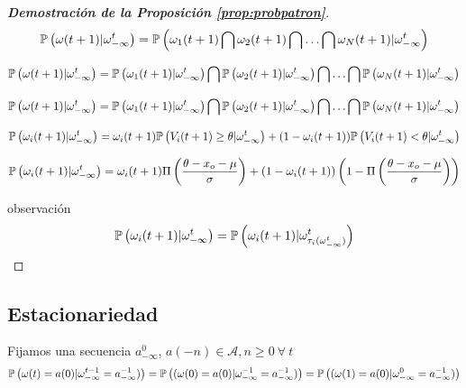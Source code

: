 \begin{proof}[\bf{Demostración de la Proposición \ref{prop:probpatron}}]
\begin{equation}
  \mathbb{P}\left(\omega(t+1) | \omega^t_{-\infty}\right)=\mathbb{P}\left(\omega_1(t+1) \bigcap \omega_2(t+1) \bigcap \ldots \bigcap \omega_N(t+1) | \omega^t_{-\infty}\right)
\end{equation}

\begin{equation}
  \mathbb{P}\left(\omega(t+1) | \omega^t_{-\infty}\right)=\mathbb{P}\left(\omega_1(t+1) | \omega^t_{-\infty}\right) \bigcap \mathbb{P}\left(\omega_2(t+1) | \omega^t_{-\infty}\right) \bigcap \ldots \bigcap \mathbb{P}\left(\omega_N(t+1) | \omega^t_{-\infty}\right)
\end{equation}

\begin{equation}
  \mathbb{P}\left(\omega(t+1) | \omega^t_{-\infty}\right)=\mathbb{P}\left(\omega_1(t+1) | \omega^t_{-\infty}\right) \bigcap \mathbb{P}\left(\omega_2(t+1) | \omega^t_{-\infty}\right) \bigcap \ldots \bigcap \mathbb{P}\left(\omega_N(t+1) | \omega^t_{-\infty}\right)
\end{equation}

\begin{equation}
  \mathbb{P}\left(\omega_i(t+1) | \omega^t_{-\infty}\right)=\omega_i(t+1) \mathbb{P}\left(V_i(t+1) \geq \theta | \omega^t_{-\infty}\right) +
    (1-\omega_i(t+1)) \mathbb{P}\left(V_i(t+1) < \theta | \omega^t_{-\infty}\right)
\end{equation}


\begin{equation}
  \mathbb{P}\left(\omega_i(t+1) | \omega^t_{-\infty}\right)=\omega_i(t+1) \Pi\left(\frac{\theta-x_o-\mu}{\sigma}\right) +
    (1-\omega_i(t+1)) \left( 1-\Pi\left(\frac{\theta-x_o-\mu}{\sigma}\right) \right)
\end{equation}

observación
\begin{equation}
  \mathbb{P}\left(\omega_i(t+1) | \omega^t_{-\infty}\right)=\mathbb{P}\left(\omega_i(t+1) | \omega^t_{\tau_i(\omega^t_{-\infty})}\right)
\end{equation}

\end{proof}



\subsection{Estacionariedad}

\begin{prop}\label{prop:estacionariedad}
Fijamos una secuencia $a_{-\infty}^0$, $a(-n) \in \mathcal{A}, n\geq 0 \ \forall \ t$
\begin{equation}
    \mathbb{P}\left(\omega(t)=a(0) | \omega_{-\infty}^{t-1}=a_{-\infty}^{-1})\right) = 
    \mathbb{P}\left((\omega(0)=a(0) | \omega_{-\infty}^{-1}=a_{-\infty}^{-1})\right) = 
    \mathbb{P}\left((\omega(1)=a(0) | \omega_{-\infty}^{0}=a_{-\infty}^{-1})\right)
\end{equation}
\end{prop}

